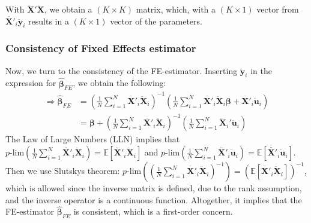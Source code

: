 With $\pmb{\ddot{X}}'\pmb{\ddot{X}}$, we obtain a $(K \times K)$ matrix, which, with a $(K \times 1)$ vector from $\pmb{\ddot{X'}}_{i} \pmb{\ddot{y}}_{i}$ results in a $(K \times 1)$ vector of the parameters.

\subsubsection*{Consistency of Fixed Effects estimator}
Now, we turn to the consistency of the FE-estimator. Inserting $\pmb{\ddot{y}}_i$ in the expression for $\pmb{\hat{\beta}}_{FE}$, we obtain the following:
\begin{align*}
    \Rightarrow \pmb{\hat{\beta}}_{FE} &= \left( \frac{1}{N} \sum_{i=1}^N {\pmb{\ddot{X'}}_{i} \pmb{\ddot{X}}_{i} } \right) ^{-1} \left(\frac{1}{N} \sum_{i=1}^N {\pmb{\ddot{X'}}_{i}}\pmb{\ddot{X}}_{i} \pmb{\beta}+\pmb{\ddot{X'}}_{i}\pmb{\ddot{u}}_i \right) \\
    &= \pmb{\beta} +\left( \frac{1}{N} \sum_{i=1}^N {\pmb{\ddot{X'}}_{i} \pmb{\ddot{X}}_{i} } \right) ^{-1} \left( \frac{1}{N} \sum_{i=1}^N {\pmb{\ddot{X}}_i' \pmb{\ddot{u}}_i} \right)
\end{align*}
The Law of Large Numbers (LLN) implies that $p\text{-lim}\left(\frac{1}{N} \sum_{i=1}^N {\pmb{\ddot{X'}}_{i} \pmb{\ddot{X}}_{i} } \right)=\mathbb{E}[\pmb{\ddot{X'}}_{i} \pmb{\ddot{X}}_{i}]$ and $p\text{-lim}\left(\frac{1}{N} \sum_{i=1}^N {\pmb{\ddot{X'}}_{i} \pmb{\ddot{u}}_{i} } \right)=\mathbb{E}[\pmb{\ddot{X'}}_{i} \pmb{\ddot{u}}_{i}]$. Then we use Slutskys theorem: $p\text{-lim}\left( \left(\frac{1}{N} \sum_{i=1}^N {\pmb{\ddot{X'}}_{i} \pmb{\ddot{X}}_{i} } \right)^{-1}\right)=(\mathbb{E}[\pmb{\ddot{X'}}_{i} \pmb{\ddot{X}}_{i}])^{-1}$, which is allowed since the inverse matrix is defined, due to the rank assumption, and the inverse operator is a continuous function. Altogether, it implies that the FE-estimator $\pmb{\hat{\beta}}_{FE}$ is consistent, which is a first-order concern.

